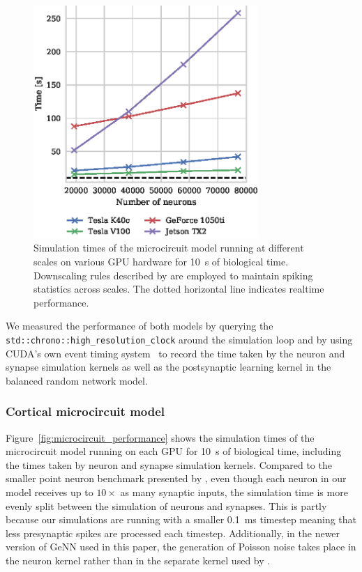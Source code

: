 \documentclass[utf8]{frontiersSCNS} %
\begin{document}
\begin{figure}
    \begin{center}
        \includegraphics[width=85mm]{figures/microcircuit_scaling}
    \end{center}
    \caption{Simulation times of the microcircuit model running at different scales on various GPU hardware for \SI{10}{\second} of biological time.
    Downscaling rules described by \citet{VanAlbada2015} are employed to maintain spiking statistics across scales.
    The dotted horizontal line indicates realtime performance.}
    \label{fig:microcircuit_performance_scaling}
\end{figure}

We measured the performance of both models by querying the \lstinline{std::chrono::high_resolution_clock} around the simulation loop and by using CUDA's own event timing system~\citep[Section~3.2.5.6.2]{NVIDIACorporation2018} to record the time taken by the neuron and synapse simulation kernels as well as the postsynaptic learning kernel in the balanced random network model.

\subsubsection{Cortical microcircuit model}
\label{sec:results/performance/microcircuit}
Figure~\ref{fig:microcircuit_performance} shows the simulation times of the microcircuit model running on each GPU for \SI{10}{\second} of biological time, including the times taken by neuron and synapse simulation kernels.
Compared to the smaller point neuron benchmark presented by \citet{Yavuz2016}, even though each neuron in our model receives up to $10\times$ as many synaptic inputs, the simulation time is more evenly split between the simulation of neurons and synapses.
This is partly because our simulations are running with a smaller \SI{0.1}{\milli\second} timestep meaning that less presynaptic spikes are processed each timestep.
Additionally, in the newer version of GeNN used in this paper, the generation of Poisson noise takes place in the neuron kernel rather than in the separate kernel used by \citeauthor{Yavuz2016}.
\end{document}

